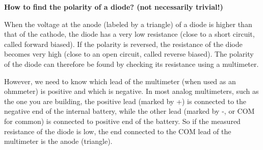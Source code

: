 \begin{enumerate}
\begin{comment}
    The resistance of the meter-head $R_m$ in parallel with R26 is:
    \[
    R_m||R26=2||31=1.88\;k\Omega
    \]
    When $R=0$, the total load of the 3V battery is 
    \[
    R_t=44+(18+x)||(10-x+1.88)=44+\frac{(18+x)(11.88-x)}{(18+x)+(11.88-x)}
    =\frac{1528.5-6.12\;x-x^2}{29.88}
    \]
    The total current through the 3V battery is:
    \[
    I_t=\frac{3V}{R_t}=\frac{3\times 29.88}{1528.5-6.12\;x-x^2}
    \]
    The current through the meter in parallel with R26 needs to be 0.05 $\mu A$:
    \[
    I_m=I_t\;\frac{18+x}{29.88}
    =\frac{3\times 29.88}{1528.5-6.12\;x-x^2}\;\frac{18+x}{29.88}
    =\frac{3(18+x)}{1528.5-6.12\;x-x^2}=0.05
    \]
    Solving for a positive value of $x$ we get $x=6.2\;k\Omega$. Now we have
    $18+x=24.2$, $10-x=3.8$. 

    The total resistance is
    \[
    R_t=\frac{1528.5-6.12\;x-x^2}{29.88}=48.6\;k\Omega
    \]
    and the total current is
    \[
    I_t=\frac{3}{R_t}=\frac{3}{48.6}=0.0617
    \]

    \htmladdimg{../multimeter2a.png}

  \item $\times 1\;k\Omega$ scale, $R=20\;k\Omega$
  
    The total current through the battery is
    \[
    \frac{3}{R+R19||R_t}
    \]
    The current through $R23=44\;k\Omega$ (current divider) need to be $I_t/2$    
    \[
    \frac{3}{R+R19||R_t}\;\frac{R19}{R19+R_t}=\frac{I_t}{2}
    \]
    Substituting $R=20\;k\Omega$, $R_t=48.6\;k\Omega$ and $I_t=0.0617\;mA$, 
    and solving for $R19$ we get $R19=33.96\approx 34\;k\Omega$.    
  \end{comment}

\end{enumerate}






{\bf How to find the polarity of a diode? (not necessarily trivial!)}

When the voltage at the anode (labeled by a triangle) of a diode is higher
than that of the cathode, the diode has a very low resistance (close to a short
circuit, called forward biased). If the polarity is reversed, the resistance 
of the diode becomes very high (close to an open circuit, called reverse biased).
The polarity of the diode can therefore be found by checking its resistance 
using a multimeter.

However, we need to know which lead of the multimeter (when used as an ohmmeter) 
is positive and which is negative. In most analog multimeters, such as the one 
you are building, the positive lead (marked by +) is connected to the negative 
end of the internal battery, while the other lead (marked by -, or COM for common)
is connected to positive end of the battery. So if the measured resistance of the 
diode is low, the end connected to the COM lead of the multimeter is the anode
(triangle).

